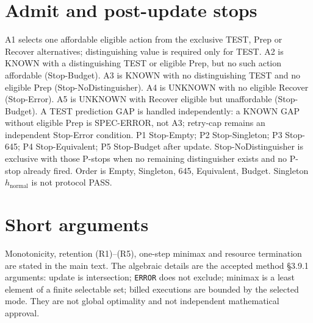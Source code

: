 \documentclass[11pt,letterpaper]{article}
\begin{document}
\section{Admit and post-update stops}
A1 selects one affordable eligible action from the exclusive TEST, Prep or
Recover alternatives; distinguishing value is required only for TEST. A2 is KNOWN with a
distinguishing TEST or eligible Prep, but no such action affordable
(Stop-Budget). A3 is KNOWN with no distinguishing TEST and no eligible Prep
(Stop-NoDistinguisher). A4 is UNKNOWN with no eligible Recover (Stop-Error).
A5 is UNKNOWN with Recover eligible but unaffordable (Stop-Budget). A TEST
prediction GAP is handled independently: a KNOWN GAP without eligible Prep is
SPEC-ERROR, not A3; retry-cap remains an independent Stop-Error condition.
P1 Stop-Empty; P2 Stop-Singleton; P3 Stop-645; P4 Stop-Equivalent;
P5 Stop-Budget after update. Stop-NoDistinguisher is exclusive with those
P-stops when no remaining distinguisher exists and no P-stop already fired.
Order is Empty, Singleton, 645, Equivalent, Budget. Singleton
\(h_{\mathrm{normal}}\) is not protocol PASS.

\section{Short arguments}
Monotonicity, retention (R1)--(R5), one-step minimax and resource termination
are stated in the main text. The algebraic details are the accepted method
§3.9.1 arguments: update is intersection; \texttt{ERROR} does not exclude;
minimax is a least element of a finite selectable set; billed executions are
bounded by the selected mode. They are not global optimality and not
independent mathematical approval.
\end{document}
